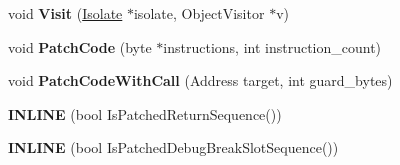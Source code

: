 \begin{DoxyCompactItemize}
\item 
\hypertarget{classv8_1_1internal_1_1_reloc_info_a3b94366a341e38ec540ff56a9aa3c91e}{}void {\bfseries Visit} (\hyperlink{classv8_1_1internal_1_1_isolate}{Isolate} $\ast$isolate, Object\+Visitor $\ast$v)\label{classv8_1_1internal_1_1_reloc_info_a3b94366a341e38ec540ff56a9aa3c91e}

\item 
\hypertarget{classv8_1_1internal_1_1_reloc_info_a55096aa878c98ff8ec79444d7184915b}{}void {\bfseries Patch\+Code} (byte $\ast$instructions, int instruction\+\_\+count)\label{classv8_1_1internal_1_1_reloc_info_a55096aa878c98ff8ec79444d7184915b}

\item 
\hypertarget{classv8_1_1internal_1_1_reloc_info_af6063a9d60b71889ff1a6550471d0de3}{}void {\bfseries Patch\+Code\+With\+Call} (Address target, int guard\+\_\+bytes)\label{classv8_1_1internal_1_1_reloc_info_af6063a9d60b71889ff1a6550471d0de3}

\item 
\hypertarget{classv8_1_1internal_1_1_reloc_info_a77d8296ef59345e035cc24d8e9d997b9}{}{\bfseries I\+N\+L\+I\+N\+E} (bool Is\+Patched\+Return\+Sequence())\label{classv8_1_1internal_1_1_reloc_info_a77d8296ef59345e035cc24d8e9d997b9}

\item 
\hypertarget{classv8_1_1internal_1_1_reloc_info_a2f7fc056b978ebba1264b6c041a39964}{}{\bfseries I\+N\+L\+I\+N\+E} (bool Is\+Patched\+Debug\+Break\+Slot\+Sequence())\label{classv8_1_1internal_1_1_reloc_info_a2f7fc056b978ebba1264b6c041a39964}

\end{DoxyCompactItemize}
